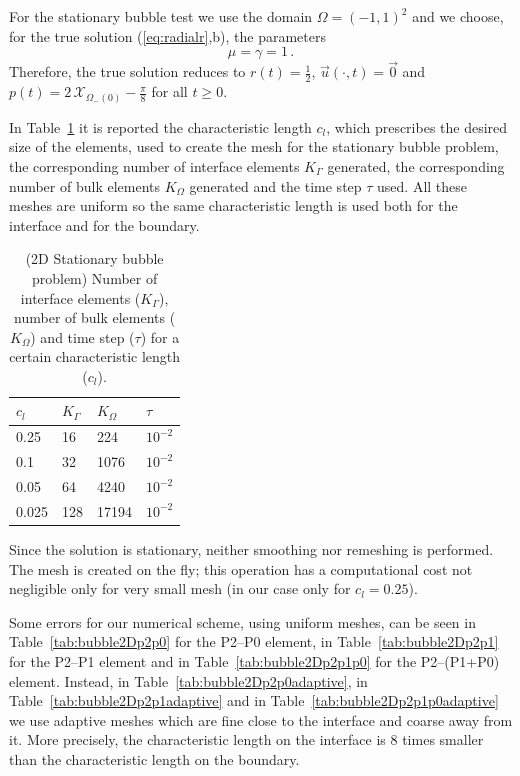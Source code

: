 \documentclass[a4paper,12pt,onecolumn]{article}
\newcommand{\bigchi}{\ensuremath{\mathrm{\mathcal{X}}}}
\newcommand{\charfcn}[1]{\bigchi_{#1}} %
\begin{document}
For the stationary bubble test we use the domain $\Omega = (-1,1)^2$ and we choose, for the true solution (\ref{eq:radialr},b), the parameters
\begin{equation*}
\mu = \gamma = 1\,. 
\end{equation*}
Therefore, the true solution reduces to $r(t) = \frac{1}{2}$, $\vec u(\cdot, t) = \vec 0$ and $p(t) = 2\,\charfcn{\Omega_-(0)} - \frac{\pi}{8}$ for all $t \geq 0$.

In Table~\ref{tab:bubble2Delements} it is reported the characteristic length $c_l$, which prescribes the desired size of the elements, used to create the mesh for the stationary bubble problem, the corresponding number of interface elements $K_\Gamma$ generated, the corresponding number of bulk elements $K_\Omega$ generated and the time step $\tau$ used. All these meshes are uniform so the same characteristic length is used both for the interface and for the boundary. 
\begin{table}
 \center
\begin{tabular}{llll}
\hline
$c_l$ & $K_\Gamma$ & $K_\Omega$ & $\tau$ \\
\hline
0.25 & 16 & 224 & $10^{-2}$ \\
0.1 & 32 & 1076 & $10^{-2}$\\
0.05 & 64 & 4240 & $10^{-2}$\\
0.025 & 128 & 17194 & $10^{-2}$ \\
\hline
\end{tabular}
\caption{(2D Stationary bubble problem) Number of interface elements ($K_\Gamma$), number of bulk elements ($K_\Omega$) and time step ($\tau$) for a certain characteristic length ($c_l$).}
\label{tab:bubble2Delements}
\end{table}

Since the solution is stationary, neither smoothing nor remeshing is performed. The mesh is created on the fly; this operation has a computational cost not negligible only for very small mesh (in our case only for $c_l=0.25$). 

Some errors for our numerical scheme, using uniform meshes, can be seen in Table~\ref{tab:bubble2Dp2p0} for the P2--P0 element, in Table~\ref{tab:bubble2Dp2p1} for the P2--P1 element and in Table~\ref{tab:bubble2Dp2p1p0} for the P2--(P1+P0) element. Instead, in Table~\ref{tab:bubble2Dp2p0adaptive}, in Table~\ref{tab:bubble2Dp2p1adaptive} and in Table~\ref{tab:bubble2Dp2p1p0adaptive} we use adaptive meshes which are fine close to the interface and coarse away from it. More precisely, the characteristic length on the interface is 8 times smaller than the characteristic length on the boundary. 
\newline
\end{document}
